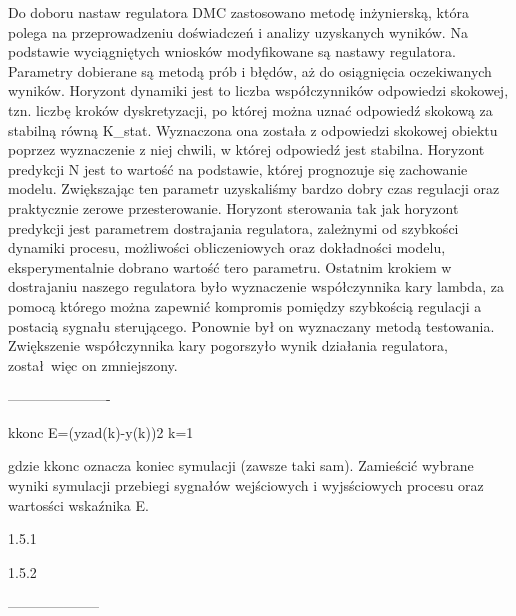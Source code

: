 Do doboru nastaw regulatora DMC zastosowano metodę inżynierską, 
która polega na przeprowadzeniu doświadczeń i analizy uzyskanych wyników. 
Na podstawie wyciągniętych wniosków modyfikowane są nastawy regulatora. 
Parametry  dobierane są metodą prób i błędów, aż do osiągnięcia oczekiwanych wyników.
Horyzont dynamiki jest to liczba współczynników odpowiedzi skokowej, tzn. liczbę kroków dyskretyzacji, po której można uznać odpowiedź skokową za stabilną równą K_stat. Wyznaczona ona została z odpowiedzi skokowej obiektu poprzez wyznaczenie z niej chwili, w której odpowiedź jest stabilna. Horyzont predykcji N jest to wartość na podstawie, której prognozuje się zachowanie modelu. Zwiększając ten parametr uzyskaliśmy bardzo dobry czas regulacji oraz praktycznie zerowe przesterowanie. Horyzont sterowania tak jak horyzont predykcji jest parametrem dostrajania regulatora, zależnymi od szybkości dynamiki procesu, możliwości obliczeniowych oraz dokładności modelu, eksperymentalnie dobrano wartość tero parametru. Ostatnim krokiem w dostrajaniu naszego regulatora było wyznaczenie współczynnika kary lambda, za pomocą którego można zapewnić kompromis pomiędzy szybkością regulacji a postacią sygnału sterującego. Ponownie był on wyznaczany metodą testowania. Zwiększenie współczynnika kary pogorszyło wynik działania regulatora, został więc on zmniejszony.


----------------------




kkonc
E=(yzad(k)-y(k))2
k=1


gdzie kkonc oznacza koniec symulacji (zawsze taki sam). 
Zamieścić wybrane wyniki symulacji 
przebiegi sygnałów wejściowych i 
wyjsściowych procesu oraz wartosści wskaźnika E. 

1.5.1 
 


1.5.2

--------------------
